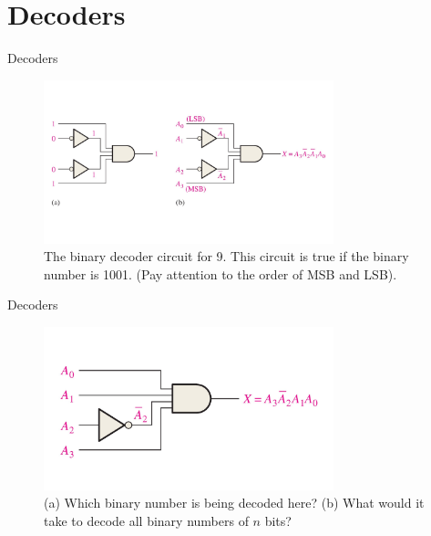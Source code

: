 \documentclass{beamer}
\begin{document}
\section{Decoders}

\begin{frame}{Decoders}
\begin{figure}
\centering
\includegraphics[width=0.75\textwidth]{figures/decoder1.pdf}
\caption{\label{fig:decoder1} The binary decoder circuit for 9.  This circuit is true if the binary number is 1001.  (Pay attention to the order of MSB and LSB).}
\end{figure}
\end{frame}

\begin{frame}{Decoders}
\begin{figure}
\centering
\includegraphics[width=0.75\textwidth]{figures/decoder2.pdf}
\caption{\label{fig:decoder2} (a) Which binary number is being decoded here? (b) What would it take to decode all binary numbers of $n$ bits?}
\end{figure}
\end{frame}
\end{document}
